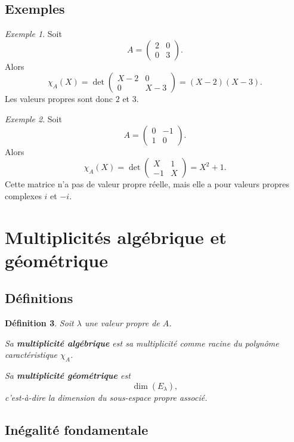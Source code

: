 \documentclass[11pt,a4paper]{article}
\newtheorem{definition}{Définition}[section]
\theoremstyle{remark}
\newtheorem{exemple}[definition]{Exemple}
\newcommand{\chiA}{\chi_A}
\begin{document}
\subsection{Exemples}

\begin{exemple}
Soit
\[
A=
\begin{pmatrix}
2 & 0\\
0 & 3
\end{pmatrix}.
\]
Alors
\[
\chiA(X)=\det\begin{pmatrix}
X-2 & 0\\
0 & X-3
\end{pmatrix}
=(X-2)(X-3).
\]
Les valeurs propres sont donc \(2\) et \(3\).
\end{exemple}

\begin{exemple}
Soit
\[
A=
\begin{pmatrix}
0 & -1\\
1 & 0
\end{pmatrix}.
\]
Alors
\[
\chiA(X)=\det\begin{pmatrix}
X & 1\\
-1 & X
\end{pmatrix}
=X^2+1.
\]
Cette matrice n’a pas de valeur propre réelle, mais elle a pour valeurs propres complexes \(i\) et \(-i\).
\end{exemple}

\section{Multiplicités algébrique et géométrique}

\subsection{Définitions}

\begin{definition}
Soit \(\lambda\) une valeur propre de \(A\).

Sa \textbf{multiplicité algébrique} est sa multiplicité comme racine du polynôme caractéristique \(\chiA\).

Sa \textbf{multiplicité géométrique} est
\[
\dim(E_\lambda),
\]
c’est-à-dire la dimension du sous-espace propre associé.
\end{definition}

\subsection{Inégalité fondamentale}
\end{document}

